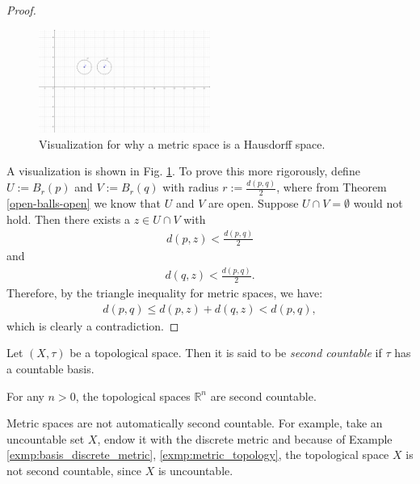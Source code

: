 \begin{proof}
	\begin{figure}[h!]		
		\centering 
		\includegraphics[trim = {3.8cm 5.8cm 9.7cm 2.8cm}, width=0.5\textwidth, clip]{Figures/metric-spaces-Hausdorff-spaces-v2.png}
		\caption{Visualization for why a metric space is a Hausdorff space.}
		\label{metric-space-Hausdorff-space}
	\end{figure} 
	A visualization is shown in Fig. \ref{metric-space-Hausdorff-space}. To prove this more rigorously, define $U := B_{r}(p)$ and $V:=B_{r}(q)$ with radius $r := \frac{d(p, q)}{2}$, where from Theorem \ref{open-balls-open} we know that $U$ and $V$ are open. Suppose $U\cap V = \emptyset$ would not hold. Then there exists a $z\in U\cap V$ with 
	\begin{align}
		d(p, z) < \frac{d(p, q)}{2}
	\end{align}
	and 
	\begin{align}
		d(q, z) < \frac{d(p, q)}{2}. 
	\end{align}
	Therefore, by the triangle inequality for metric spaces, we have: 
	\begin{align}
		d(p, q) \leq d(p, z) + d(q, z) < d(p, q), 
	\end{align}
	which is clearly a contradiction. 
\end{proof}

\begin{defn}
	Let $(X, \tau)$ be a topological space. Then it is said to be \textit{second countable} if $\tau$ has a countable basis. 
\end{defn}

\begin{exmp}
	For any $n > 0$, the topological spaces $\mathbb R^n$ are second countable. 
\end{exmp}

\begin{remark}
	Metric spaces are not automatically second countable. For example, take an uncountable set $X$, endow it with the discrete metric and because of Example \ref{exmp:basis_discrete_metric}, \ref{exmp:metric_topology},  the topological space $X$ is not second countable, since $X$ is uncountable. 
\end{remark}	

